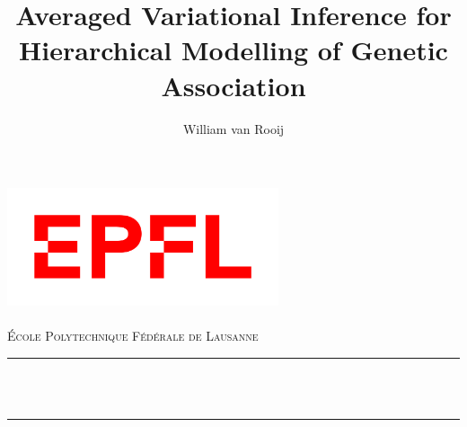 \documentclass[a4paper, 11pt]{report}
\title{Averaged Variational Inference for Hierarchical Modelling of Genetic Association}
\author{William van Rooij}
\numberwithin{equation}{chapter}
\begin{document}
\SetEndCharOfAlgoLine{}


\begin{titlepage}

\newcommand{\HRule}{\rule{\linewidth}{0.5mm}} %

\center

\includegraphics[width=8cm]{images/EPFL_logo.png}\\[1cm] %
 


\quad\\[1.5cm]
\textsc{\Large École Polytechnique Fédérale de Lausanne}\\[0.5cm] %

\makeatletter
\HRule \\[0.4cm]
{ \huge \bfseries \@title}\\[0.4cm] %
\HRule \\[1.5cm]
 


\end{titlepage}
\end{document}
